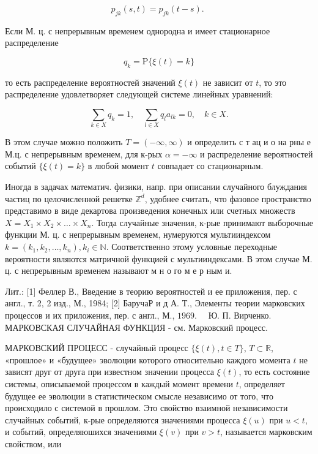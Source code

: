 \documentclass[10pt]{article}
\begin{document}
\[

p_{j k}(s, t)=p_{j k}(t-s) \text {. }

\]



Если М. ц. с непрерывным временем однородна и имеет стационарное распределение



\[

q_{k}=\mathrm{P}\{\xi(t)=k\}

\]



то есть распределение вероятностей значений $\xi(t)$ не зависит от $t$, то это распределение удовлетворяет следующей системе линейных уравнений:



\[

\sum_{k \in X} q_{k}=1, \quad \sum_{l \in X} q_{l} a_{l k}=0, \quad k \in X .

\]



В этом случае можно положить $T=(-\infty, \infty)$ и определить с т ац и о на рны е М.ц. с непрерывным временем, для к-рых $\alpha=-\infty$ и распределение вероятностей событий $\{\xi(t)=k\}$ в любой момент $t$ совпадает со стационарным.



Иногда в задачах математич. физики, напр. при описании случайного блуждания частиц по целочисленной решетке $\mathbb{Z}^{d}$, удобнее считать, что фазовое пространство представимо в виде декартова произведения конечных или счетных множеств $X=X_{1} \times X_{2} \times \ldots \times X_{n}$. Тогда случайные значения, к-рые принимают выборочные функции М. ц. с непрерывным временем, нумеруются мультииндексом $k=\left(k_{1}, k_{2}, \ldots, k_{n}\right), k_{i} \in \mathbb{N}$. Соответственно этому условные переходные вероятности являются матричной функцией с мультииндексами. В этом случае М. ц. с непрерывным временем называют м н о го м е р ным и.



Лит.: [1] Феллер В., Введение в теорию вероятностей и ее приложения, пер. с англ., т. 2, 2 изд., М., 1984; [2] БаручаР и д А. Т., Элементы теории марковских процессов и их приложения, пер. с англ., М., $1969 . \quad$ Ю. П. Вирченко. МАРКОВСКАЯ СЛУЧАЙНАЯ ФУНКЦИЯ - см. Марковский процесс.



МАРКОВСКИЙ ПРОЦЕСС - случайный процесс $\{\xi(t), t \in T\}$, $T \subset \mathbb{R}$, «прошлое» и «будущее» эволюции которого относительно каждого момента $t$ не зависят друг от друга при известном значении процесса $\xi(t)$, то есть состояние системы, описываемой процессом в каждый момент времени $t$, определяет будущее ее эволюции в статистическом смысле независимо от того, что происходило с системой в прошлом. Это свойство взаимной независимости случайных событий, к-рые определяются значениями процесса $\xi(u)$ при $u<t$, и событий, определяюшихся значениями $\xi(v)$ при $v>t$, называется марковским свойством, или
\end{document}
